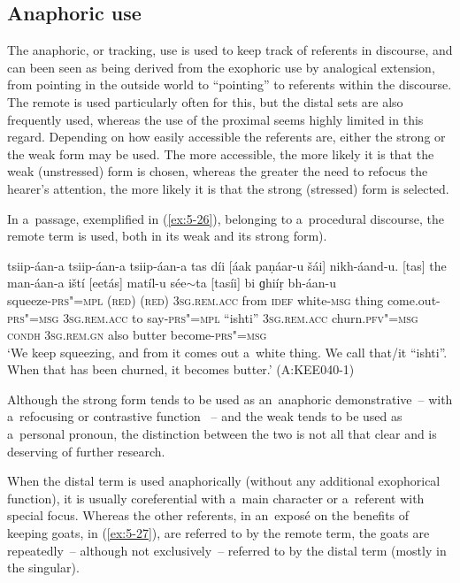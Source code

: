 \subsection{Anaphoric use}
\label{subsec:5-2-4}

The anaphoric, or tracking, use is used to keep track of referents in discourse, and can been seen as being derived from the exophoric use by analogical extension, from pointing in the outside world to ``pointing'' to referents within the discourse. The remote is used particularly often for this, but the distal sets are also frequently used, whereas the use of the proximal seems highly limited in this regard. Depending on how easily accessible the referents are, either the strong or the weak form may be used. The more accessible, the more likely it is that the weak (unstressed) form is chosen, whereas the greater the need to refocus the hearer's attention, the more likely it is that the strong (stressed) form is selected. 


In a~passage, exemplified in (\ref{ex:5-26}), belonging to a~procedural discourse, the remote term is used, both in its weak and its strong form).


\begin{exe}
\ex
\label{ex:5-26}
\gll tsiip-áan-a tsiip-áan-a tsiip-áan-a tas díi [áak paṇáar-u
 šái] nikh-áand-u. [tas] the man-áan-a iští [eetás] matíl-u
sée$\sim$ta [tasíi] bi ɡhiíṛ bh-áan-u \\
squeeze-\textsc{prs"=mpl} (\textsc{red}) (\textsc{red}) \textsc{3}\textsc{sg.rem.acc} from
\textsc{idef} white-\textsc{msg} thing come.out-\textsc{prs"=msg} \textsc{3sg}.\textsc{rem.acc}
to say-\textsc{prs"=mpl} ``ishti'' \textsc{3sg}.\textsc{rem.acc} churn.\textsc{pfv"=msg}
\textsc{condh} \textsc{3sg}.\textsc{rem.gn} also butter become-\textsc{prs"=msg}\\
\glt `We keep squeezing, and from it comes out a~white thing. We call that/it ``ishti''. When that has been
churned, it becomes butter.' (A:KEE040-1)
\end{exe}

Although the strong form tends to be used as an~anaphoric demonstrative~-- with a~refocusing or contrastive function \citep[432]{diessel2006}~-- and the weak tends to be used as a~personal pronoun, the distinction between the two is not all that clear and is deserving of further research.

When the distal term is used anaphorically (without any additional exophorical function), it is usually coreferential with a~main character or a~referent with special focus. Whereas the other referents, in an~exposé on the benefits of keeping goats, in (\ref{ex:5-27}), are referred to by the remote term, the goats are repeatedly~-- although not exclusively~-- referred to by the distal term (mostly in the singular). 

